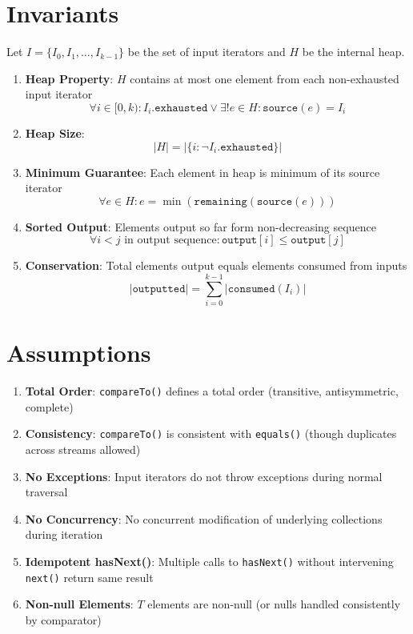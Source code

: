 \documentclass[11pt]{article}
\begin{document}
\section{Invariants}

Let $I = \{I_0, I_1, \ldots, I_{k-1}\}$ be the set of input iterators and $H$ be the internal heap.

\begin{enumerate}
    \item \textbf{Heap Property}: $H$ contains at most one element from each non-exhausted input iterator
    \[
    \forall i \in [0, k): I_i.\texttt{exhausted} \lor \exists! e \in H : \texttt{source}(e) = I_i
    \]

    \item \textbf{Heap Size}:
    \[
    |H| = |\{i : \neg I_i.\texttt{exhausted}\}|
    \]

    \item \textbf{Minimum Guarantee}: Each element in heap is minimum of its source iterator
    \[
    \forall e \in H: e = \min(\texttt{remaining}(\texttt{source}(e)))
    \]

    \item \textbf{Sorted Output}: Elements output so far form non-decreasing sequence
    \[
    \forall i < j \text{ in output sequence}: \texttt{output}[i] \leq \texttt{output}[j]
    \]

    \item \textbf{Conservation}: Total elements output equals elements consumed from inputs
    \[
    |\texttt{outputted}| = \sum_{i=0}^{k-1} |\texttt{consumed}(I_i)|
    \]
\end{enumerate}

\section{Assumptions}

\begin{enumerate}
    \item \textbf{Total Order}: \texttt{compareTo()} defines a total order (transitive, antisymmetric, complete)
    \item \textbf{Consistency}: \texttt{compareTo()} is consistent with \texttt{equals()} (though duplicates across streams allowed)
    \item \textbf{No Exceptions}: Input iterators do not throw exceptions during normal traversal
    \item \textbf{No Concurrency}: No concurrent modification of underlying collections during iteration
    \item \textbf{Idempotent hasNext()}: Multiple calls to \texttt{hasNext()} without intervening \texttt{next()} return same result
    \item \textbf{Non-null Elements}: $T$ elements are non-null (or nulls handled consistently by comparator)
\end{enumerate}
\end{document}
